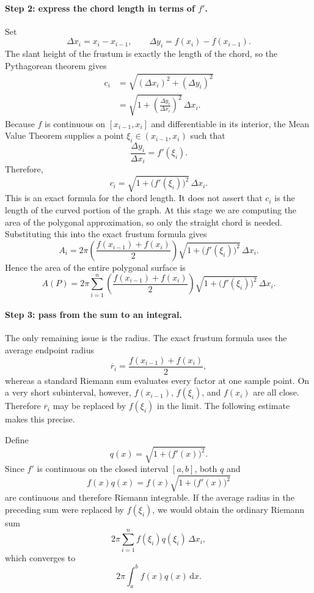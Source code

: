 \paragraph{Step 2: express the chord length in terms of \(f'\).}
Set
\[
    \Delta x_i=x_i-x_{i-1},
    \qquad
    \Delta y_i=f(x_i)-f(x_{i-1}).
\]
The slant height of the frustum is exactly the length of the chord, so the
Pythagorean theorem gives
\begin{align*}
    c_i
    &=\sqrt{(\Delta x_i)^2+(\Delta y_i)^2} \\
    &=\sqrt{1+\left(\frac{\Delta y_i}{\Delta x_i}\right)^2}
      \,\Delta x_i.
\end{align*}
Because \(f\) is continuous on \([x_{i-1},x_i]\) and differentiable in its
interior, the Mean Value Theorem supplies a point
\(\xi_i\in(x_{i-1},x_i)\) such that
\[
    \frac{\Delta y_i}{\Delta x_i}=f'(\xi_i).
\]
Therefore,
\[
    c_i
    =\sqrt{1+\bigl(f'(\xi_i)\bigr)^2}\,\Delta x_i.
\]
This is an exact formula for the chord length.  It does not assert that
\(c_i\) is the length of the curved portion of the graph.  At this stage we
are computing the area of the polygonal approximation, so only the straight
chord is needed.
Substituting this into the exact frustum formula gives
\[
    A_i
    =2\pi
      \left(\frac{f(x_{i-1})+f(x_i)}{2}\right)
      \sqrt{1+\bigl(f'(\xi_i)\bigr)^2}\,\Delta x_i.
\]
Hence the area of the entire polygonal surface is
\[
    A(P)=2\pi\sum_{i=1}^n
      \left(\frac{f(x_{i-1})+f(x_i)}{2}\right)
      \sqrt{1+\bigl(f'(\xi_i)\bigr)^2}\,\Delta x_i.
\]

\paragraph{Step 3: pass from the sum to an integral.}
The only remaining issue is the radius.  The exact frustum formula uses the
average endpoint radius
\[
    \overline r_i=\frac{f(x_{i-1})+f(x_i)}{2},
\]
whereas a standard Riemann sum evaluates every factor at one sample point.
On a very short subinterval, however, \(f(x_{i-1})\), \(f(\xi_i)\), and
\(f(x_i)\) are all close.  Therefore \(\overline r_i\) may be replaced by
\(f(\xi_i)\) in the limit.  The following estimate makes this precise.

Define
\[
    q(x)=\sqrt{1+\bigl(f'(x)\bigr)^2}.
\]
Since \(f'\) is continuous on the closed interval \([a,b]\), both \(q\)
and
\[
    f(x)q(x)=f(x)\sqrt{1+\bigl(f'(x)\bigr)^2}
\]
are continuous and therefore Riemann integrable.  If the average radius in
the preceding sum were replaced by \(f(\xi_i)\), we would obtain the
ordinary Riemann sum
\[
    2\pi\sum_{i=1}^n
    f(\xi_i)q(\xi_i)\,\Delta x_i,
\]
which converges to
\[
    2\pi\int_a^b f(x)q(x)\,\mathrm{d}x.
\]

